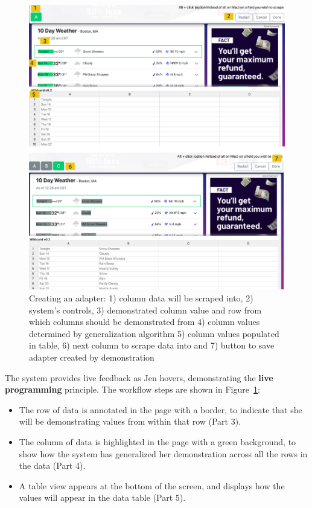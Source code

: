 \documentclass[sigconf,10pt]{acmart}
\providecommand{\tightlist}{%
  \setlength{\itemsep}{0pt}\setlength{\parskip}{0pt}}
\begin{document}
\begin{figure}
  \includegraphics[width=\textwidth]{media/creating.png}
  \caption{\label{fig:creating} Creating an adapter: 1) column data will be scraped into, 2) system's controls, 3) demonstrated column value and row from which columns should be demonstrated from 4) column values determined by generalization algorithm 5) column values populated in table, 6) next column to scrape data into and 7) button to save adapter created by demonstration}
\end{figure}

The system provides live feedback as Jen hovers, demonstrating the
\textbf{live programming} principle. The workflow steps are shown in
Figure~\ref{fig:creating}:

\begin{itemize}
\tightlist
\item
  The row of data is annotated in the page with a border, to indicate
  that she will be demonstrating values from within that row (Part 3).
\item
  The column of data is highlighted in the page with a green background,
  to show how the system has generalized her demonstration across all
  the rows in the data (Part 4).
\item
  A table view appears at the bottom of the screen, and displays how the
  values will appear in the data table (Part 5).
\end{itemize}
\end{document}
